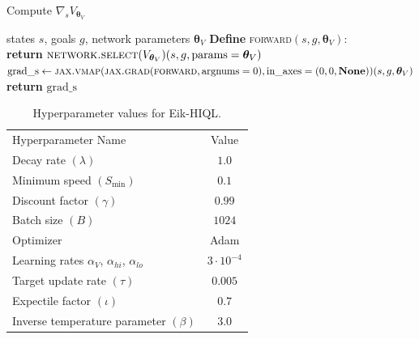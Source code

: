 \documentclass{article}
\theoremstyle{plain}
\theoremstyle{definition}
\theoremstyle{remark}
\begin{document}
\begin{algorithm}[H]
\caption{Compute $\nabla_s V_{\bm{\theta}_V}$}
\label{alg:grad_V}
\begin{algorithmic}
 states $s$, goals $g$, network parameters $\bm{\theta}_V$  
    \STATE \textbf{Define} \textsc{forward}$(s, g, \bm{\theta}_V)$: \\
    \STATE \quad \textbf{return} $\textsc{network.select}(V_{\bm{\theta}_V})(s, g, \text{params}=\bm{\theta}_V)$ \\
    
    \STATE $ \text{grad\_s} \gets 
    \textsc{jax.vmap}(\textsc{jax.grad}(\textsc{forward}, \text{argnums}=0), \text{in\_axes}=(0, 0, \textbf{None}))(s, g, \bm{\theta}_V)$ \\
    \STATE \textbf{return} $\text{grad\_s}$ \\
\end{algorithmic}
\end{algorithm}

\begin{table}[H]
\centering
\caption{Hyperparameter values for Eik-HIQL.}
\label{tab:Hyper}
\begin{tabular}{c c c c}\toprule
\multicolumn{2}{l}{Hyperparameter Name} & \multicolumn{2}{c}{Value}\\
\cmidrule(lr){1-2} \cmidrule(lr){3-4}
\multicolumn{2}{l}{Decay rate  $(\lambda)$} & \multicolumn{2}{c}{$1.0$} \\
\multicolumn{2}{l}{Minimum speed $(S_{\text{min}})$} & \multicolumn{2}{c}{$0.1$} \\
\multicolumn{2}{l}{Discount factor $(\gamma)$} & \multicolumn{2}{c}{$0.99$} \\
\multicolumn{2}{l}{Batch size $(B)$} & \multicolumn{2}{c}{$1024$} \\
\multicolumn{2}{l}{Optimizer} & \multicolumn{2}{c}{Adam}\\
\multicolumn{2}{l}{Learning rates $\alpha_V$, $\alpha_{hi}$, $\alpha_{lo}$} & \multicolumn{2}{c}{$3\cdot10^{-4}$}\\
\multicolumn{2}{l}{Target update rate $(\tau)$} & \multicolumn{2}{c}{$0.005$}\\
\multicolumn{2}{l}{Expectile factor $(\iota)$} & \multicolumn{2}{c}{$0.7$}\\
\multicolumn{2}{l}{Inverse temperature parameter $(\beta)$} & \multicolumn{2}{c}{$3.0$}\\
\bottomrule
\end{tabular}
\end{table}
\end{document}
